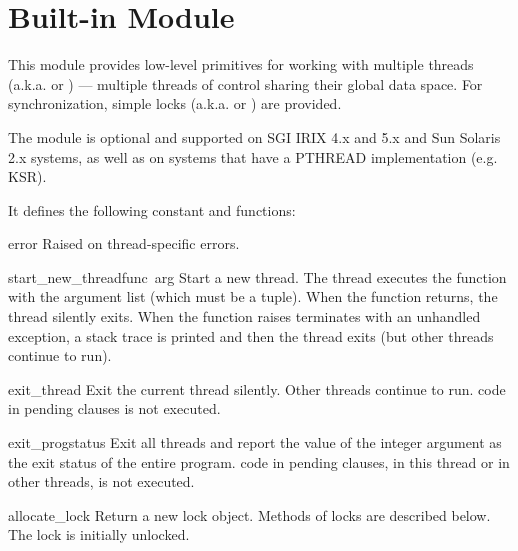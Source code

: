 \section{Built-in Module }

This module provides low-level primitives for working with multiple
threads (a.k.a.  or ) --- multiple
threads of control sharing their global data space.  For
synchronization, simple locks (a.k.a.  or ) are provided.

The module is optional and supported on SGI IRIX 4.x and 5.x and Sun
Solaris 2.x systems, as well as on systems that have a PTHREAD
implementation (e.g. KSR).

It defines the following constant and functions:

\renewcommand{\indexsubitem}{(in module thread)}
\begin{excdesc}{error}
Raised on thread-specific errors.
\end{excdesc}

\begin{funcdesc}{start_new_thread}{func\, arg}
Start a new thread.  The thread executes the function 
with the argument list  (which must be a tuple).  When the
function returns, the thread silently exits.  When the function raises
terminates with an unhandled exception, a stack trace is printed and
then the thread exits (but other threads continue to run).
\end{funcdesc}

\begin{funcdesc}{exit_thread}{}
Exit the current thread silently.  Other threads continue to run.
 code in pending  clauses is not executed.
\end{funcdesc}

\begin{funcdesc}{exit_prog}{status}
Exit all threads and report the value of the integer argument
 as the exit status of the entire program.
 code in pending  clauses, in this thread
or in other threads, is not executed.
\end{funcdesc}

\begin{funcdesc}{allocate_lock}{}
Return a new lock object.  Methods of locks are described below.  The
lock is initially unlocked.
\end{funcdesc}

